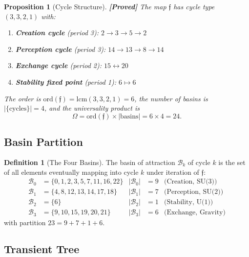 \documentclass[12pt,a4paper]{article}
\newcommand{\proved}[1]{\textcolor{proved}{\textbf{[Proved]}} #1}
\newtheorem{proposition}[theorem]{Proposition}
\theoremstyle{definition}
\newtheorem{definition}[theorem]{Definition}
\theoremstyle{remark}
\newcommand{\Reeds}{\mathfrak{f}}
\newcommand{\Basin}{\mathcal{B}}
\begin{document}
\begin{proposition}[Cycle Structure]
\label{prop:cycles}
\proved{The map $\Reeds$ has cycle type $(3,3,2,1)$ with:}
\begin{enumerate}
  \item \textbf{Creation cycle} (period 3): $2 \to 3 \to 5 \to 2$
  \item \textbf{Perception cycle} (period 3): $14 \to 13 \to 8 \to 14$
  \item \textbf{Exchange cycle} (period 2): $15 \leftrightarrow 20$
  \item \textbf{Stability fixed point} (period 1): $6 \mapsto 6$
\end{enumerate}
The order is $\mathrm{ord}(\Reeds) = \mathrm{lcm}(3,3,2,1) = 6$, the number of
basins is $|\{\text{cycles}\}| = 4$, and the universality product is
\begin{equation}
  \Omega = \mathrm{ord}(\Reeds) \times |\text{basins}| = 6 \times 4 = 24.
\end{equation}
\end{proposition}

\subsection{Basin Partition}

\begin{definition}[The Four Basins]
\label{def:basins}
The basin of attraction $\Basin_k$ of cycle $k$ is the set of all elements
eventually mapping into cycle $k$ under iteration of $\Reeds$:
\begin{align}
  \Basin_0 &= \{0,1,2,3,5,7,11,16,22\} & |\Basin_0| &= 9 & \text{(Creation, SU(3))} \\
  \Basin_1 &= \{4,8,12,13,14,17,18\} & |\Basin_1| &= 7 & \text{(Perception, SU(2))} \\
  \Basin_2 &= \{6\} & |\Basin_2| &= 1 & \text{(Stability, U(1))} \\
  \Basin_3 &= \{9,10,15,19,20,21\} & |\Basin_3| &= 6 & \text{(Exchange, Gravity)}
\end{align}
with partition $23 = 9 + 7 + 1 + 6$.
\end{definition}

\subsection{Transient Tree}
\end{document}
